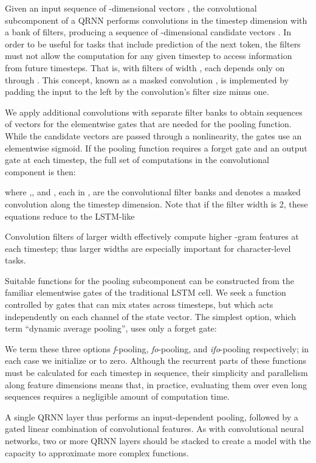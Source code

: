 \documentclass{article} \usepackage{iclr2017_conference,times}
\begin{document}
Given an input sequence  of  -dimensional vectors , the convolutional subcomponent of a QRNN performs convolutions in the timestep dimension with a bank of  filters, producing a sequence  of -dimensional candidate vectors . In order to be useful for tasks that include prediction of the next token, the filters must not allow the computation for any given timestep to access information from future timesteps. That is, with filters of width , each  depends only on  through . This concept, known as a masked convolution \citep{vandenOord2016}, is implemented by padding the input to the left by the convolution's filter size minus one.

We apply additional convolutions with separate filter banks to obtain sequences of vectors for the elementwise gates that are needed for the pooling function. While the candidate vectors are passed through a  nonlinearity, the gates use an elementwise sigmoid. If the pooling function requires a forget gate  and an output gate  at each timestep, the full set of computations in the convolutional component is then:

where ,, and , each in , are the convolutional filter banks and  denotes a masked convolution along the timestep dimension. Note that if the filter width is 2, these equations reduce to the LSTM-like

Convolution filters of larger width effectively compute higher -gram features at each timestep; thus larger widths are especially important for character-level tasks.

Suitable functions for the pooling subcomponent can be constructed from the familiar elementwise gates of the traditional LSTM cell. We seek a function controlled by gates that can mix states across timesteps, but which acts independently on each channel of the state vector. The simplest option, which \cite{Balduzzi2016} term ``dynamic average pooling'', uses only a forget gate:

We term these three options \emph{f}-pooling, \emph{fo}-pooling, and \emph{ifo}-pooling respectively; in each case we initialize  or  to zero.
Although the recurrent parts of these functions must be calculated for each timestep in sequence, their simplicity and parallelism along feature dimensions means that, in practice, evaluating them over even long sequences requires a negligible amount of computation time.

A single QRNN layer thus performs an input-dependent pooling, followed by a gated linear combination of convolutional features. As with convolutional neural networks, two or more QRNN layers should be stacked to create a model with the capacity to approximate more complex functions.
\end{document}
